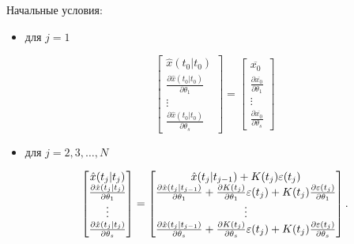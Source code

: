 \documentclass[a4paper,14pt]{extarticle}
\begin{document}
Начальные условия:
\begin{itemize}

\item для $j = 1$

\begin{equation}
\label{eq:senstateinitcond1}
\begin{bmatrix}
	\hat{x}(t_0|t_0) \\
	\frac{\partial \hat{x}(t_0|t_0)}{\partial \theta_1} \\
	\vdots \\
	\frac{\partial \hat{x}(t_0|t_0)}{\partial \theta_s}
\end{bmatrix} =
\begin{bmatrix}
	\overline{x_0} \\
	\frac{\partial \overline{x_0}}{\partial \theta_1} \\
	\vdots \\
	\frac{\partial \overline{x_0}}{\partial \theta_s}
\end{bmatrix}
\end{equation}

\item для $j = 2, 3, \ldots, N$

\begin{equation}
\label{eq:senstateinitcondj}
\begin{bmatrix}
	\hat{x}(t_j|t_j) \\
	\frac{\partial \hat{x}(t_j|t_j)}{\partial \theta_1} \\
	\vdots \\
	\frac{\partial \hat{x}(t_j|t_j)}{\partial \theta_s}
\end{bmatrix} =
\begin{bmatrix}
	\hat{x}(t_j|t_{j-1}) + K(t_j) \varepsilon(t_j) \\
	\frac{\partial \hat{x}(t_j|t_{j-1})}{\partial \theta_1} + \frac{\partial K(t_j)}
		{\partial \theta_1} \varepsilon(t_j) + K(t_j) \frac{\partial \varepsilon(t_j)}
		{\partial \theta_1} \\
		\vdots \\
	\frac{\partial \hat{x}(t_j|t_{j-1})}{\partial \theta_s} + \frac{\partial K(t_j)}
		{\partial \theta_s} \varepsilon(t_j) + K(t_j) \frac{\partial \varepsilon(t_j)}
		{\partial \theta_s}
\end{bmatrix}.
\end{equation}

\end{itemize}
\end{document}
